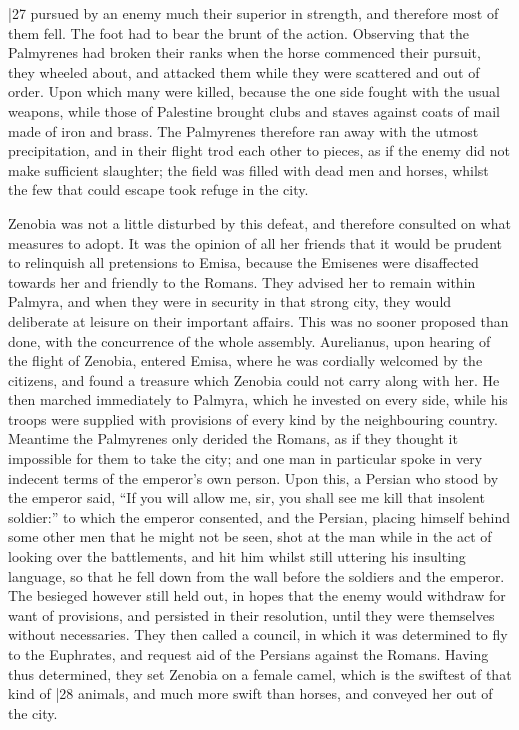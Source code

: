 |27 pursued by an enemy much their superior in strength, and therefore most of them fell. The foot had to bear the brunt of the action. Observing that the Palmyrenes had broken their ranks when the horse commenced their pursuit, they wheeled about, and attacked them while they were scattered and out of order. Upon which many were killed, because the one side fought with the usual weapons, while those of Palestine brought clubs and staves against coats of mail made of iron and brass. The Palmyrenes therefore ran away with the utmost precipitation, and in their flight trod each other to pieces, as if the enemy did not make sufficient slaughter; the field was filled with dead men and horses, whilst the few that could escape took refuge in the city.

Zenobia was not a little disturbed by this defeat, and therefore consulted on what measures to adopt. It was the opinion of all her friends that it would be prudent to relinquish all pretensions to Emisa, because the Emisenes were disaffected towards her and friendly to the Romans. They advised her to remain within Palmyra, and when they were in security in that strong city, they would deliberate at leisure on their important affairs. This was no sooner proposed than done, with the concurrence of the whole assembly. Aurelianus, upon hearing of the flight of Zenobia, entered Emisa, where he was cordially welcomed by the citizens, and found a treasure which Zenobia could not carry along with her. He then marched immediately to Palmyra, which he invested on every side, while his troops were supplied with provisions of every kind by the neighbouring country. Meantime the Palmyrenes only derided the Romans, as if they thought it impossible for them to take the city; and one man in particular spoke in very indecent terms of the emperor's own person. Upon this, a Persian who stood by the emperor said, ``If you will allow me, sir, you shall see me kill that insolent soldier:'' to which the emperor consented, and the Persian, placing himself behind some other men that he might not be seen, shot at the man while in the act of looking over the battlements, and hit him whilst still uttering his insulting language, so that he fell down from the wall before the soldiers and the emperor. The besieged however still held out, in hopes that the enemy would withdraw for want of provisions, and persisted in their resolution, until they were themselves without necessaries. They then called a council, in which it was determined to fly to the Euphrates, and request aid of the Persians against the Romans. Having thus determined, they set Zenobia on a female camel, which is the swiftest of that kind of
|28 animals, and much more swift than horses, and conveyed her out of the city.

